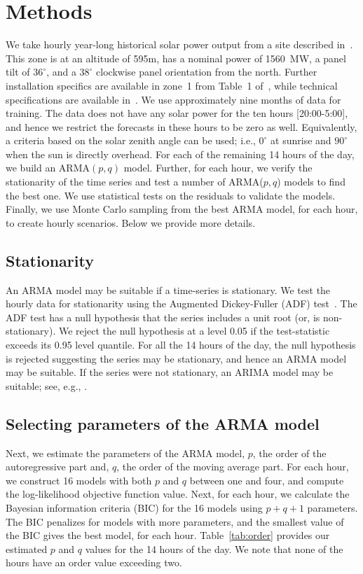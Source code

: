 \documentclass[review]{elsarticle}
\begin{document}
\section{Methods}
We take hourly year-long historical solar power output 
from a site described in~\cite{golestaneh2016generation}. 
This zone is at an altitude of 595m, has a nominal power of 1560~MW, a panel 
tilt 
of $36^\circ$, and a $38^\circ$ clockwise panel orientation from the north. 
Further installation specifics are available in zone~1 from Table~1 
of~\cite{golestaneh2016generation}, while technical specifications are 
available 
in~\cite{technical}.  We use approximately nine months of data 
for training. The data does not have any solar power for the ten hours 
[20:00-5:00], and hence we restrict the forecasts in these hours to be zero as 
well. Equivalently, a criteria based on the solar zenith angle can be used; 
i.e., $0^\circ$ at sunrise and $90^\circ$ when the sun is directly overhead. 
For 
each of the remaining 14 hours of the day, we build an ARMA$(p,q)$ 
model. Further, for each hour, we verify the stationarity of the time 
series and test a number of ARMA($p,q$) models to find the best 
one. We use statistical tests on the residuals to validate the models. Finally, 
we use Monte Carlo sampling from the best ARMA model, for each hour, to create 
hourly scenarios. Below we provide more details.

\subsection{Stationarity}
An ARMA model may be suitable if a time-series is stationary. We test 
the hourly data for stationarity using the Augmented 
Dickey-Fuller (ADF) test~\cite{dickey1979distribution}. The ADF test has a null 
hypothesis that the series includes a unit root (or, is non-stationary). We 
reject the null hypothesis at a level 0.05 if the test-statistic exceeds its 
0.95 level quantile. For all the 14 hours of the day, the null hypothesis is 
rejected suggesting the series may be stationary, and hence an ARMA model may 
be suitable. If the series were not stationary, an ARIMA model may be suitable; 
see, e.g., \cite{contreras2003arima}.

\subsection{Selecting parameters of the ARMA model}
Next, we estimate the parameters of the ARMA model, $p$, the order of the 
autoregressive part and, $q$, the order of the moving average part. For each 
hour, we construct 16 models with both $p$ and $q$ between one and four, and 
compute 
the log-likelihood objective function value. Next, for each hour, we calculate 
the Bayesian information criteria (BIC) for the 16 models using $p + q + 1$ 
parameters.  The BIC penalizes for models with more parameters, and the 
smallest value of the BIC gives the best model, for each 
hour. Table~\ref{tab:order} provides our estimated $p$ and $q$  values for 
the 14 hours of the day. We note that none of the hours have an order value 
exceeding two.
\end{document}
